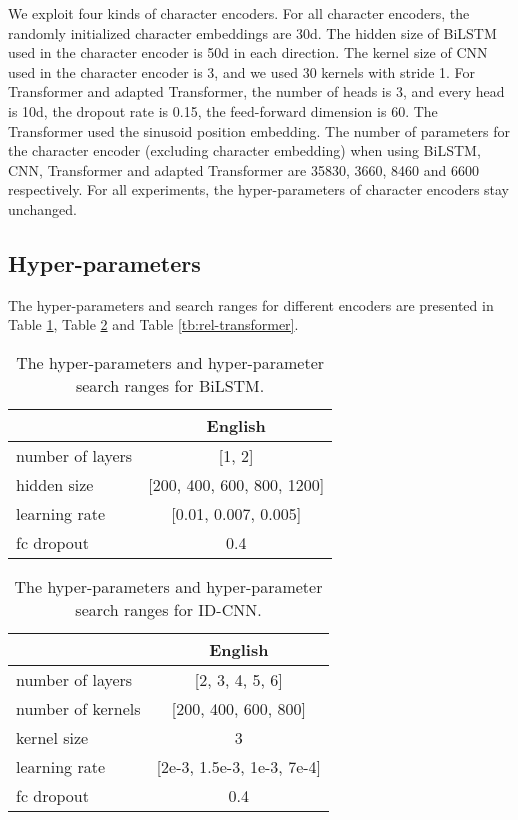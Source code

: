 \documentclass[11pt,a4paper]{article}
\begin{document}
We exploit four kinds of character encoders. For all character encoders, the randomly initialized character embeddings are 30d. The hidden size of BiLSTM used in the character encoder is 50d in each direction. The kernel size of CNN used in the character encoder is 3, and we used 30 kernels with stride 1. For Transformer and adapted Transformer, the number of heads is 3, and every head is 10d, the dropout rate is 0.15, the feed-forward dimension is 60. The Transformer used the sinusoid position embedding. The number of parameters for the character encoder (excluding character embedding) when using BiLSTM, CNN, Transformer and adapted Transformer are 35830, 3660, 8460 and 6600 respectively. For all experiments, the hyper-parameters of character encoders stay unchanged.

\subsection{Hyper-parameters} \label{supply:random_search}


The hyper-parameters and search ranges for different encoders are presented in Table \ref{tb:bilstm}, Table \ref{tb:dilate-cnn} and Table \ref{tb:rel-transformer}.

\begin{table}[t] \small
  \begin{tabular}{lc}\toprule
                   & English                    \\ \midrule
  number of layers & [1, 2]                     \\
  hidden size      & [200, 400, 600, 800, 1200] \\
  learning rate    & [0.01, 0.007, 0.005]       \\
  fc dropout       & 0.4 \\ \bottomrule
  \end{tabular}
  \caption{The hyper-parameters and hyper-parameter search ranges for BiLSTM.} \label{tb:bilstm}
\end{table}

\begin{table}[t] \small
  \begin{tabular}{lc}
  \toprule
                    & English                        \\
  \midrule
  number of layers  & [2, 3, 4, 5, 6]                \\
  number of kernels & [200, 400, 600, 800]           \\
  kernel size       & 3                              \\
  learning rate     & [2e-3, 1.5e-3, 1e-3, 7e-4] \\
  fc dropout        & 0.4  \\ \bottomrule
  \end{tabular}
  \caption{The hyper-parameters and hyper-parameter search ranges for ID-CNN.} \label{tb:dilate-cnn}
\end{table}
\end{document}
